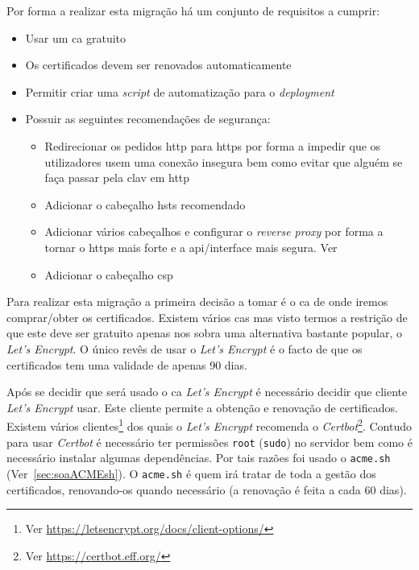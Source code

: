 Por forma a realizar esta migração há um conjunto de requisitos a cumprir:\label{sec:sol_httpsReq}
\begin{itemize}
    \item Usar um \acrshort{ca} gratuito
    \item Os certificados devem ser renovados automaticamente
    \item Permitir criar uma \textit{script} de automatização para o \textit{deployment}
    \item Possuir as seguintes recomendações de segurança:
    \begin{itemize}
        \item Redirecionar os pedidos \acrshort{http} para \acrshort{https} por forma a impedir que os utilizadores usem uma conexão insegura bem como evitar que alguém se faça passar pela \acrshort{clav} em \acrshort{http}
        \item Adicionar o cabeçalho \acrshort{hsts} recomendado~\cite{hsts,hsts2}
        \item Adicionar vários cabeçalhos e configurar o \textit{reverse proxy} por forma a tornar o \acrshort{https} mais forte e a \acrshort{api}/interface mais segura. Ver~\cite{helmet,letEnA+,dhparams,secExpress,strongSSL}
        \item Adicionar o cabeçalho \acrfull{csp}~\cite{helmetCSP,csp}
    \end{itemize}
\end{itemize}


Para realizar esta migração a primeira decisão a tomar é o \acrfull{ca} de onde iremos comprar/obter os certificados. Existem vários \acrshort{ca}s mas visto termos a restrição de que este deve ser gratuito apenas nos sobra uma alternativa bastante popular, o \textit{Let's Encrypt}. O único revês de usar o \textit{Let's Encrypt} é o facto de que os certificados tem uma validade de apenas 90 dias.

Após se decidir que será usado o \acrshort{ca} \textit{Let's Encrypt} é necessário decidir que cliente \textit{Let's Encrypt} usar. Este cliente permite a obtenção e renovação de certificados. Existem vários clientes\footnote{Ver \url{https://letsencrypt.org/docs/client-options/}} dos quais o \textit{Let's Encrypt} recomenda o \textit{Certbot}\footnote{Ver \url{https://certbot.eff.org/}}. Contudo para usar \textit{Certbot} é necessário ter permissões \texttt{root} (\texttt{sudo}) no servidor bem como é necessário instalar algumas dependências. Por tais razões foi usado o \texttt{acme.sh} (Ver~\ref{sec:soaACMEsh}). O \texttt{acme.sh} é quem irá tratar de toda a gestão dos certificados, renovando-os quando necessário (a renovação é feita a cada 60 dias).

